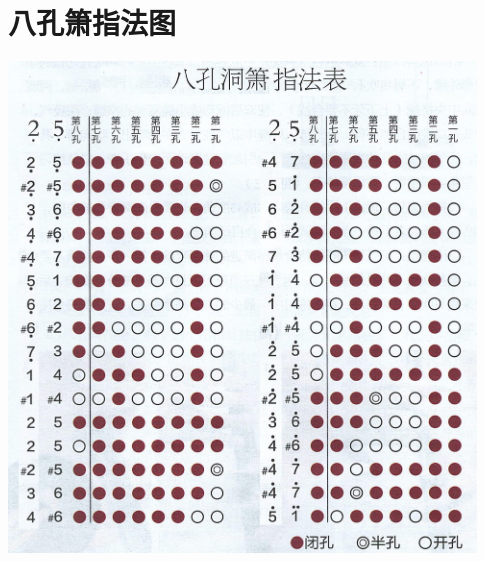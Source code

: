 \documentclass[cn,pad,chinese]{elegantbook}
\begin{document}
\chapter{八孔箫指法图}
\includegraphics[width=0.93\textwidth]{dongxiao/Scan.jpeg}
\end{document}
